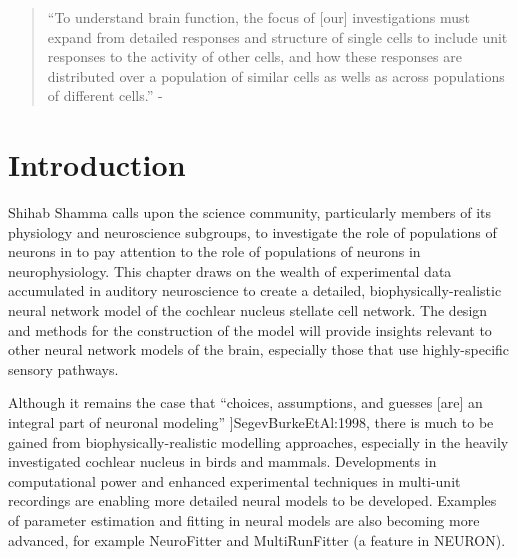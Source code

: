 

\begin{quotation}
  ``To understand brain function, the focus of [our] investigations must
  expand from detailed responses and structure of single cells to
  include unit responses to the activity of other cells, and how these
  responses are distributed over a population of similar cells as
  wells as across populations of different cells.''  - \textit{\citet[,p.TODO]{Shamma:1998}}
\end{quotation}


\section{Introduction}

Shihab Shamma calls upon the science community, particularly members
of its physiology and neuroscience subgroups, to investigate the role
of populations of neurons in to pay attention to the role of
populations of neurons in neurophysiology. This chapter draws on the wealth of experimental data accumulated in auditory
neuroscience to create a detailed, biophysically-realistic
neural network model of the cochlear nucleus stellate cell network.  The
design and methods for the construction of the model will provide
insights relevant to other neural network models of the brain, especially those
that use highly-specific sensory pathways.  


Although it remains the case that ``choices, assumptions, and guesses [are] an
integral part of neuronal modeling'' \citep[\todo[inline]{page
  no.}]{SegevBurkeEtAl:1998}, there is much to be gained from
biophysically-realistic modelling approaches, especially in the heavily
investigated cochlear nucleus in birds and mammals. Developments in
computational power and enhanced experimental techniques in multi-unit
recordings are enabling more detailed neural models to be developed. Examples of parameter
estimation and fitting in neural models are also becoming more advanced, for
example NeuroFitter \citep{VanAchardEtAl:2007} and MultiRunFitter (a feature in
NEURON).

